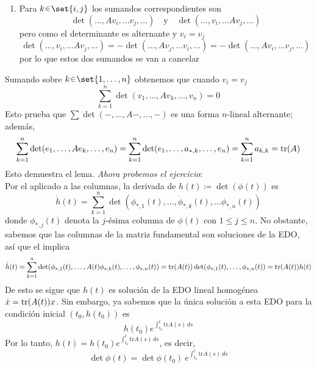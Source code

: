 \begin{sol}[Demostración]
\begin{enumerate}[label = (\roman*)]
\item Para $k \en \set{i,j}$ los sumandos correspondientes son
\[
\det(\dots,Av_i,\dots v_j,\dots)%
\quad\text{y}\quad
\det(\dots,v_i,\dots Av_j,\dots)%
\]
pero como el determinante es alternante y $v_i = v_j$
\[
\det(\dots,v_i,\dots Av_j,\dots) = -\det(\dots,Av_j,\dots v_i,\dots) = -\det(\dots,Av_i,\dots v_j,\dots)
\]
por lo que estos dos sumandos se van a cancelar
\end{enumerate}
Sumando sobre $k \en \set{1,\dots,n}$ obtenemos que cuando $v_i = v_j$
\[
\sum^n_{k=1} \det(v_1,\dots,Av_k,\dots,v_n) = 0
\]
Esto prueba que $\sum\det(-,\dots,A-,\dots,-)$ es una forma $n\text{-lineal}$ alternante; además,
\[
\sum^n_{k=1} \det(e_1,\dots,Ae_k,\dots,e_n) = \sum^n_{k=1} \det(e_1,\dots,a_{*,k},\dots,e_n) = \sum^n_{k=1}a_{k,k} = \tr(A)
\]
Esto demuestra el lema.\clearpage
\emph{Ahora probemos el ejercicio}:\\
Por el  aplicado a las columnas, la derivada de $h(t) \coloneq \det(\phi(t))$ es
\[
\dot{h}(t) = \sum^n_{k=1} \det(\phi_{*,1}(t),\dots,\dot{\phi}_{*,k}(t),\dots\phi_{*,n}(t))
\]
donde $\phi_{*,j}(t)$ denota la $j\text{-ésima}$ columna de $\phi(t)$ con $1 \leq j \leq n$. No obstante, sabemos que las columnas de la matriz fundamental son soluciones de la EDO, así que el  implica
\[
\dot{h}(t) = \sum^n_{k=1} \det(\phi_{*,1}(t),\dots,A(t)\phi_{*,k}(t),\dots,\phi_{*,n}(t)) = \tr(A(t))\det(\phi_{*,1}(t),\dots,\phi_{*,n}(t)) = \tr(A(t))h(t)
\]
De esto se sigue que $h(t)$ es solución de la EDO lineal homogénea $\dot{x} = \tr(A(t))x$. Sin embargo, ya sabemos que la única solución a esta EDO para la condición inicial $(t_0,h(t_0))$ es
\[
h(t_0)e^{\int_{t_0}^{t} \mathrm{tr}A(s)\,ds}
\]
Por lo tanto, $h(t) = h(t_0)e^{\int_{t_0}^{t} \mathrm{tr}A(s)\,ds}$, es decir,
\[
\det\phi(t) = \det\phi(t_0) \ e^{\int_{t_0}^{t} \mathrm{tr}A(s)\,ds}
\]
\end{sol}

